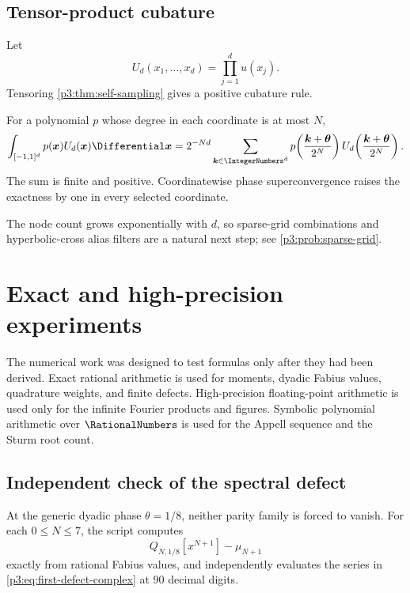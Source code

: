 \documentclass[11pt,oneside]{article}
\numberwithin{equation}{section}
\theoremstyle{definition}
\theoremstyle{remark}
\begin{document}
\subsection{Tensor-product cubature}

Let
\begin{equation}
 U_d(x_1,\ldots,x_d)=\prod_{j=1}^{d}u(x_j).
 \label{p3:eq:tensor-density}
\end{equation}
Tensoring \cref{p3:thm:self-sampling} gives a positive cubature rule.

\begin{corollary}
\label{p3:cor:tensor-cubature}
For a polynomial $p$ whose degree in each coordinate is at most $N$,
\begin{equation}
 \int_{[-1,1]^d}p(\bm x)U_d(\bm x)\Differential\bm x
 =2^{-Nd}\sum_{\bm k\in\IntegerNumbers^d}
 p\!\left(\frac{\bm k+\bm\theta}{2^N}\right)
 U_d\!\left(\frac{\bm k+\bm\theta}{2^N}\right).
 \label{p3:eq:tensor-cubature}
\end{equation}
The sum is finite and positive.  Coordinatewise phase superconvergence raises the exactness by one in every selected coordinate.
\end{corollary}

The node count grows exponentially with $d$, so sparse-grid combinations and hyperbolic-cross alias filters are a natural next step; see \cref{p3:prob:sparse-grid}.

\section{Exact and high-precision experiments}
\label{p3:sec:experiments}

The numerical work was designed to test formulas only after they had been derived.  Exact rational arithmetic is used for moments, dyadic Fabius values, quadrature weights, and finite defects.  High-precision floating-point arithmetic is used only for the infinite Fourier products and figures.  Symbolic polynomial arithmetic over $\RationalNumbers$ is used for the Appell sequence and the Sturm root count.

\subsection{Independent check of the spectral defect}

At the generic dyadic phase $\theta=1/8$, neither parity family is forced to vanish.  For each $0\le N\le7$, the script computes
\[
 Q_{N,1/8}[x^{N+1}]-\mu_{N+1}
\]
exactly from rational Fabius values, and independently evaluates the series in \eqref{p3:eq:first-defect-complex} at 90 decimal digits.
\end{document}
